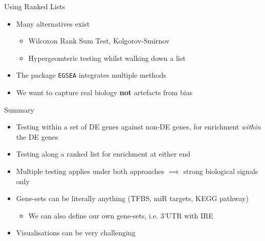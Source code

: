 \documentclass[aspectratio=169,11pt]{beamer}
\begin{document}
\begin{frame}{Using Ranked Lists}

	\begin{itemize}
		\item Many alternatives exist
		\begin{itemize}
			\item Wilcoxon Rank Sum Test, Kolgorov-Smirnov
			\item Hypergeomteric testing whilst walking down a list
		\end{itemize}
		\item The package \texttt{EGSEA} integrates multiple methods
		\item We want to capture real biology \textbf{not} artefacts from bias
	\end{itemize}
	
\end{frame}

\begin{frame}{Summary}

	\begin{itemize}
		\item Testing within a set of DE genes against non-DE genes, for enrichment \textit{within} the DE genes
		\item Testing along a ranked list for enrichment at either end
		\item Multiple testing applies under both approaches $\implies$ strong biological signals only
		\item Gene-sets can be literally anything (TFBS, miR targets, KEGG pathway)
		\begin{itemize}
			\item We can also define our own gene-sets, i.e. 3'UTR with IRE
		\end{itemize}
		\item Visualisations can be very challenging
	\end{itemize}

\end{frame}
\end{document}
